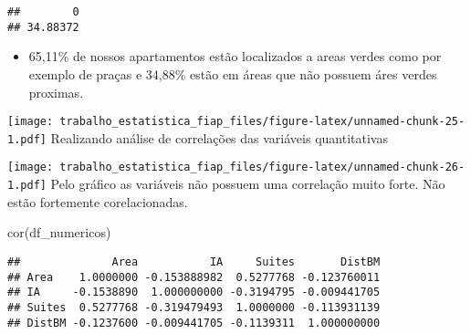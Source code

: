 \documentclass[
]{article}
\newenvironment{Shaded}{\begin{snugshade}}{\end{snugshade}}
\newcommand{\AttributeTok}[1]{\textcolor[rgb]{0.77,0.63,0.00}{#1}}
\newcommand{\ConstantTok}[1]{\textcolor[rgb]{0.00,0.00,0.00}{#1}}
\newcommand{\FunctionTok}[1]{\textcolor[rgb]{0.00,0.00,0.00}{#1}}
\newcommand{\NormalTok}[1]{#1}
\newcommand{\OtherTok}[1]{\textcolor[rgb]{0.56,0.35,0.01}{#1}}
\newcommand{\SpecialCharTok}[1]{\textcolor[rgb]{0.00,0.00,0.00}{#1}}
\providecommand{\tightlist}{%
  \setlength{\itemsep}{0pt}\setlength{\parskip}{0pt}}
\begin{document}
\begin{verbatim}
##        0 
## 34.88372
\end{verbatim}

\begin{itemize}
\tightlist
\item
  65,11\% de nossos apartamentos estão localizados a areas verdes como
  por exemplo de praças e 34,88\% estão em áreas que não possuem áres
  verdes proximas.
\end{itemize}

\begin{Shaded}
\end{Shaded}

\texttt{[image: trabalho\_estatistica\_fiap\_files/figure-latex/unnamed-chunk-25-1.pdf]}
Realizando análise de correlações das variáveis quantitativas

\begin{Shaded}
\end{Shaded}

\texttt{[image: trabalho\_estatistica\_fiap\_files/figure-latex/unnamed-chunk-26-1.pdf]}
Pelo gráfico as variáveis não possuem uma correlação muito forte. Não
estão fortemente corelacionadas.

\begin{Shaded}
\begin{Highlighting}[]
\FunctionTok{cor}\NormalTok{(df\_numericos)}
\end{Highlighting}
\end{Shaded}

\begin{verbatim}
##              Area           IA     Suites       DistBM
## Area    1.0000000 -0.153888982  0.5277768 -0.123760011
## IA     -0.1538890  1.000000000 -0.3194795 -0.009441705
## Suites  0.5277768 -0.319479493  1.0000000 -0.113931139
## DistBM -0.1237600 -0.009441705 -0.1139311  1.000000000
\end{verbatim}
\end{document}
